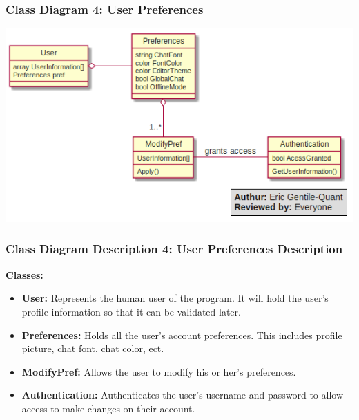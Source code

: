 \documentclass[twoside,letterpaper]{article}
\begin{document}
{\newpage

\subsubsection[Class Diagram 4: User Preferences]{\rmfamily\bfseries\color{black}
	Class Diagram 4: User Preferences}
\hypertarget{RefHeading22059017292}{}
\bigskip

\includegraphics[width=\textwidth]{images/ClassDiagrams/UserPref}

\newpage

\subsubsection[Class Diagram Description 4: User Preferences Description]{\rmfamily\bfseries\color{black}
	Class Diagram Description 4: User Preferences Description}
\hypertarget{RefHeading22059017292}{}

\textbf{Classes:}
\begin{itemize}

       \item \textbf{User:} Represents the human user of the program. It will hold the user's profile information so that it can be validated later. 
       \item \textbf{Preferences:} Holds all the user's account preferences. This includes profile picture, chat font, chat color, ect.
       \item \textbf{ModifyPref:} Allows the user to modify his or her's preferences. 
       \item \textbf{Authentication:} Authenticates the user's username and password to allow access to make changes on their account.
\end{itemize}

}
\end{document}
